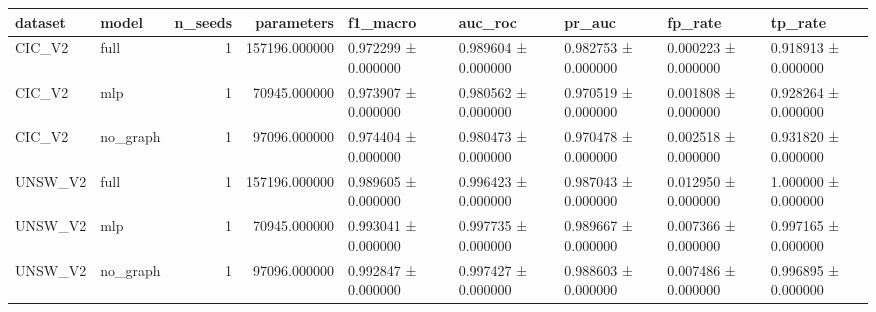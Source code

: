 \begin{tabular}{llrrlllll}
\toprule
dataset & model & n_seeds & parameters & f1_macro & auc_roc & pr_auc & fp_rate & tp_rate \\
\midrule
CIC_V2 & full & 1 & 157196.000000 & 0.972299 ± 0.000000 & 0.989604 ± 0.000000 & 0.982753 ± 0.000000 & 0.000223 ± 0.000000 & 0.918913 ± 0.000000 \\
CIC_V2 & mlp & 1 & 70945.000000 & 0.973907 ± 0.000000 & 0.980562 ± 0.000000 & 0.970519 ± 0.000000 & 0.001808 ± 0.000000 & 0.928264 ± 0.000000 \\
CIC_V2 & no_graph & 1 & 97096.000000 & 0.974404 ± 0.000000 & 0.980473 ± 0.000000 & 0.970478 ± 0.000000 & 0.002518 ± 0.000000 & 0.931820 ± 0.000000 \\
UNSW_V2 & full & 1 & 157196.000000 & 0.989605 ± 0.000000 & 0.996423 ± 0.000000 & 0.987043 ± 0.000000 & 0.012950 ± 0.000000 & 1.000000 ± 0.000000 \\
UNSW_V2 & mlp & 1 & 70945.000000 & 0.993041 ± 0.000000 & 0.997735 ± 0.000000 & 0.989667 ± 0.000000 & 0.007366 ± 0.000000 & 0.997165 ± 0.000000 \\
UNSW_V2 & no_graph & 1 & 97096.000000 & 0.992847 ± 0.000000 & 0.997427 ± 0.000000 & 0.988603 ± 0.000000 & 0.007486 ± 0.000000 & 0.996895 ± 0.000000 \\
\bottomrule
\end{tabular}
